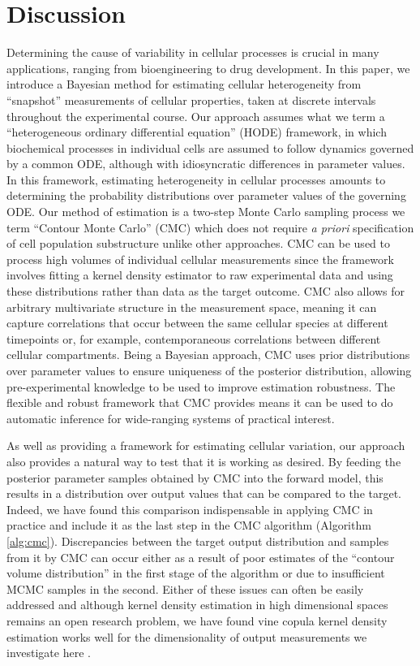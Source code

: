 \section{Discussion}
\label{sec:discussion}
Determining the cause of variability in cellular processes is crucial in many applications, ranging from bioengineering to drug development. In this paper, we introduce a Bayesian method for estimating cellular heterogeneity from ``snapshot'' measurements of cellular properties, taken at discrete intervals throughout the experimental course. Our approach assumes what we term a ``heterogeneous ordinary differential equation'' (HODE) framework, in which biochemical processes in individual cells are assumed to follow dynamics governed by a common ODE, although with idiosyncratic differences in parameter values. In this framework, estimating heterogeneity in cellular processes amounts to determining the probability distributions over parameter values of the governing ODE. Our method of estimation is a two-step Monte Carlo sampling process we term ``Contour Monte Carlo'' (CMC) which does not require \textit{a priori} specification of cell population substructure unlike other approaches. CMC can be used to process high volumes of individual cellular measurements since the framework involves fitting a kernel density estimator to raw experimental data and using these distributions rather than data as the target outcome. CMC also allows for arbitrary multivariate structure in the measurement space, meaning it can capture correlations that occur between the same cellular species at different timepoints or, for example, contemporaneous correlations between different cellular compartments. Being a Bayesian approach, CMC uses prior distributions over parameter values to ensure uniqueness of the posterior distribution, allowing pre-experimental knowledge to be used to improve estimation robustness. The flexible and robust framework that CMC provides means it can be used to do automatic inference for wide-ranging systems of practical interest.

As well as providing a framework for estimating cellular variation, our approach also provides a natural way to test that it is working as desired. By feeding the posterior parameter samples obtained by CMC into the forward model, this results in a distribution over output values that can be compared to the target. Indeed, we have found this comparison indispensable in applying CMC in practice and include it as the last step in the CMC algorithm (Algorithm \ref{alg:cmc}). Discrepancies between the target output distribution and samples from it by CMC can occur either as a result of poor estimates of the ``contour volume distribution'' in the first stage of the algorithm or due to insufficient MCMC samples in the second. Either of these issues can often be easily addressed and although kernel density estimation in high dimensional spaces remains an open research problem, we have found vine copula kernel density estimation works well for the dimensionality of output measurements we investigate here \cite{nagler2016evading}.

